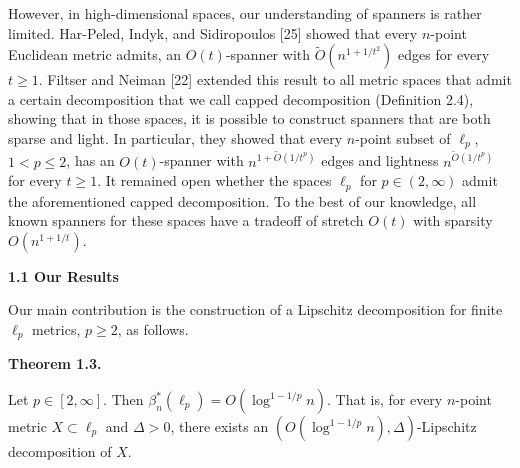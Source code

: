 \documentclass[10pt,a4paper]{amsart}
\begin{document}
\par
\par
However, in high-dimensional spaces, our understanding of spanners is rather limited. Har-Peled, Indyk, and Sidiropoulos [25] showed that every $n$-point Euclidean metric admits, an $O(t)$-spanner with $\tilde{O}(n^{1+1/t^{2}})$ edges for every $t\geq 1$. Filtser and Neiman [22] extended this result to all metric spaces that admit a certain decomposition that we call capped decomposition (Definition 2.4), showing that in those spaces, it is possible to construct spanners that are both sparse and light. In particular, they showed that every $n$-point subset of $\ell_{p}$, $1<p\leq 2$, has an $O(t)$-spanner with $n^{1+\tilde{O}(1/t^{p})}$ edges and lightness $n^{\tilde{O}(1/t^{p})}$ for every $t\geq 1$. It remained open whether the spaces $\ell_{p}$ for $p\in(2,\infty)$ admit the aforementioned capped decomposition. To the best of our knowledge, all known spanners for these spaces have a tradeoff of stretch $O(t)$ with sparsity $O(n^{1+1/t})$.
\par
\par
\par
\par\medskip\noindent\textbf{1.1 Our Results}\par
Our main contribution is the construction of a Lipschitz decomposition for finite $\ell_{p}$ metrics, $p\geq 2$, as follows.
\par
\par

\par\medskip\noindent\textbf{Theorem 1.3.}\par
Let $p\in[2,\infty]$. Then $\beta^{*}_{n}(\ell_{p})=O(\log^{1-1/p}{n})$. That is, for every $n$-point metric $X\subset\ell_{p}$ and $\Delta>0$, there exists an $(O(\log^{1-1/p}{n}),\Delta)$-Lipschitz decomposition of $X$.
\par
\end{document}
